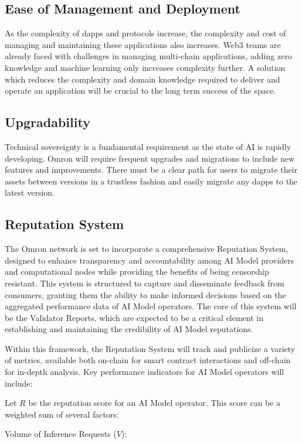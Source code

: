 \documentclass[conference]{IEEEtran}
\begin{document}
\subsection{Ease of Management and Deployment}
As the complexity of dapps and protocols increase, the complexity and cost of managing and maintaining these applications also increases. Web3 teams are already faced with challenges in managing multi-chain applications, adding zero knowledge and machine learning only increases complexity further. A solution which reduces the complexity and domain knowledge required to deliver and operate an application will be crucial to the long term success of the space.

\subsection{Upgradability}
Technical sovereignty is a fundamental requirement as the state of AI is rapidly developing. Omron will require frequent upgrades and migrations to include new features and improvements. There must be a clear path for users to migrate their assets between versions in a trustless fashion and easily migrate any dapps to the latest version.

\subsection{Reputation System}
The Omron network is set to incorporate a comprehensive Reputation System, designed to enhance transparency and accountability among AI Model providers and computational nodes while providing the benefits of being censorship resistant. This system is structured to capture and disseminate feedback from consumers, granting them the ability to make informed decisions based on the aggregated performance data of AI Model operators. The core of this system will be the Validator Reports, which are expected to be a critical element in establishing and maintaining the credibility of AI Model reputations.

Within this framework, the Reputation System will track and publicize a variety of metrics, available both on-chain for smart contract interactions and off-chain for in-depth analysis. Key performance indicators for AI Model operators will include:

Let $R$ be the reputation score for an AI Model operator. This score can be a weighted sum of several factors:

Volume of Inference Requests ($V$):
\end{document}
